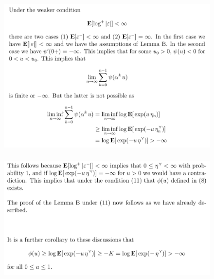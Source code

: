 \documentclass[c, dvipsnames, 8pt]{beamer}
\begin{document}
\begin{frame}[shrink=5]
	
	
	
	\frametitle{\insertsection} 
	\begin{figure}
		\centering
		\includegraphics[width=1\linewidth]{screenshot056}
		\label{fig:screenshot001}
	\end{figure}
	
	
	
	
	
\end{frame}


\begin{frame}[shrink=5]
	
	
	
	\frametitle{\insertsection} 
	\begin{figure}
		\centering
		\includegraphics[width=1\linewidth]{screenshot057}
		\label{fig:screenshot001}
	\end{figure}
	
	
	
	
	
\end{frame}
\end{document}
